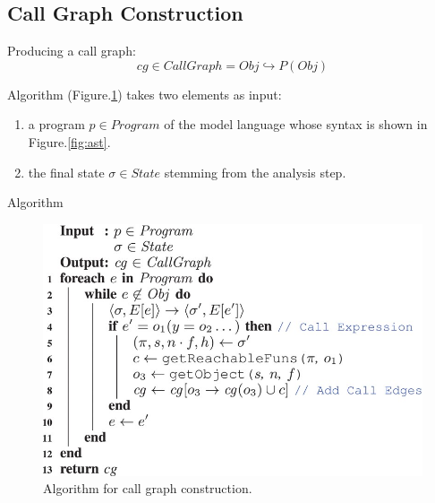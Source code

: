 \documentclass[9pt, xcolor=table]{beamer}
\begin{document}
\subsection{Call Graph Construction}
%
\begin{frame}
	\begin{alertblock}{Producing a call graph:}
		\begin{equation}
		cg \in CallGraph = Obj \hookrightarrow P(Obj)
		\end{equation}	\label{equ:cg}
	\end{alertblock}
	
	\vfill
	Algorithm (Figure.\ref{fig:algo}) takes two elements as input: 
	\begin{enumerate}
		\item a program $p \in Program$ of the model language whose syntax is
shown in Figure.\ref{fig:ast}.
		\item the final state $\sigma \in State$ stemming from the analysis step.
	\end{enumerate}
	
	
\end{frame}
%
\begin{frame}{Algorithm}
	\begin{figure}[htp]
		\centering
		\includegraphics[width=\textwidth,height=0.75\paperheight]{algo.jpg}
		\caption{Algorithm for call graph construction.}
		\label{fig:algo}
	\end{figure}
\end{frame}
%
\end{document}
